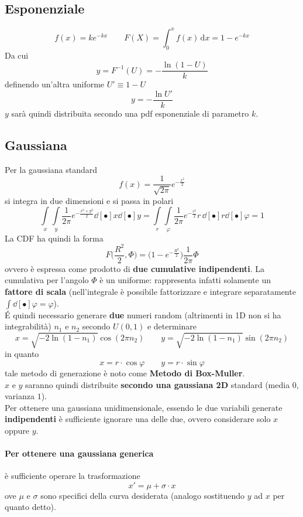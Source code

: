 \documentclass[10pt, oneside]{book}
\newcommand{\integral}[4]{\int_{#1}^{#2} #3 \, \mathrm{d}#4}
\begin{document}
\subsection{Esponenziale}
\[f(x) = k e^{-kx} \qquad F(X) = \integral{0}{x}{f(x)}{x} = 1 - e^{-kx}\]
Da cui
\[y = F^{-1}(U) = -\frac{\ln (1 - U)}{k}\]
definendo un'altra uniforme $U' \equiv 1 - U$
\[y = - \frac{\ln U'}{k}\]
$y$ sarà quindi distribuita secondo una pdf esponenziale di parametro $k$.

\subsection{Gaussiana}
Per la gaussiana standard
\[f(x) = \frac{1}{\sqrt{2\pi}} e^{\displaystyle - \frac{x^2}{2}}\]
si integra in due dimensioni e si passa in polari
\[\int\limits_x \int\limits_y \frac{1}{2 \pi} e^{\displaystyle - \frac{x^2 + y^2}{2}} \dd[•]{x} \dd[•]{y} = \int\limits_r \int\limits_\varphi \frac{1}{2 \pi} e^{\displaystyle - \frac{r^2}{2}} r \, \dd[•]{r} \dd[•]{\varphi} = 1\]
La CDF ha quindi la forma
\[F\big(\frac{R^2}{2}, \Phi\big) = \big(1 - e^{\displaystyle - \frac{R^2}{2}}\big) \frac{1}{2\pi} \Phi\]
ovvero è espressa come prodotto di \textbf{due cumulative indipendenti}. La cumulativa per l'angolo $\Phi$ è un uniforme: rappresenta infatti solamente un \textbf{fattore di scala} (nell'integrale è possibile fattorizzare e integrare separatamente $\displaystyle \int \dd[•]{\varphi} = \varphi$).\\
\'E quindi necessario generare \textbf{due} numeri random (altrimenti in 1D non si ha integrabilità) $n_1$ e $n_2$ secondo $U(0,1)$ e determinare
\[x = \sqrt{- 2 \ln (1 - n_1)} \cos (2 \pi n_2)\qquad y = \sqrt{- 2 \ln (1 - n_1)} \sin (2 \pi n_2)\]
in quanto
\[x = r \cdot \cos \varphi \qquad y = r \cdot \sin \varphi\]
tale metodo di generazione è noto come \textbf{Metodo di Box-Muller}.\\
$x$ e $y$ saranno quindi distribuite \textbf{secondo una gaussiana 2D} standard (media $0$, varianza $1$).\\
Per ottenere una gaussiana unidimensionale, essendo le due variabili generate \textbf{indipendenti} è sufficiente ignorare una delle due, ovvero considerare solo $x$ oppure $y$.

\paragraph{Per ottenere una gaussiana generica} è sufficiente operare la trasformazione
\[x' = \mu + \sigma \cdot x\]
ove $\mu$ e $\sigma$ sono specifici della curva desiderata (analogo sostituendo $y$ ad $x$ per quanto detto).
\end{document}
